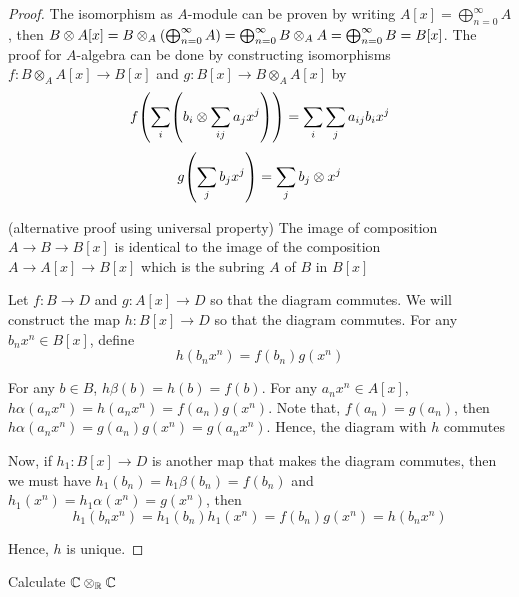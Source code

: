 \begin{proof}
	The isomorphism as $A$-module can be proven by writing $A[x] = \bigoplus_{n=0}^\infty A$, then $B \otimes A[x] = B \otimes_A \tuple*{\bigoplus_{n=0}^\infty A} = \bigoplus_{n=0}^\infty B \otimes_A A = \bigoplus_{n=0}^\infty B = B[x]$. The proof for $A$-algebra can be done by constructing isomorphisms $f: B \otimes_A A[x] \to B[x]$ and $g: B[x] \to B \otimes_A A[x]$ by
	$$
		f\tuple*{\sum_{i} \tuple*{b_i \otimes \sum_{ij} a_{j} x^j}} = \sum_{i} \sum_{j} a_{ij} b_i x^j
	$$
	$$
		g\tuple*{\sum_{j} b_j x^j} = \sum_{j} b_j \otimes x^j
	$$
	
	(alternative proof using universal property) 
	The image of composition $A \to B \to B[x]$ is identical to the image of the composition $A \to A[x] \to B[x]$ which is the subring $A$ of $B$ in $B[x]$
	\begin{center}
	\end{center}
	
	Let $f: B \to D$ and $g: A[x] \to D$ so that the diagram commutes. We will construct the map $h: B[x] \to D$ so that the diagram commutes. For any $b_n x^n \in B[x]$, define
	$$
		h(b_n x^n) = f(b_n) g(x^n)
	$$
	
	For any $b \in B$, $h \beta(b) = h(b) = f(b)$. For any $a_n x^n \in A[x]$, $h \alpha (a_n x^n) = h(a_n x^n) = f(a_n) g(x^n)$. Note that, $f(a_n) = g(a_n)$, then $h \alpha (a_n x^n) = g(a_n) g(x^n) = g(a_n x^n)$. Hence, the diagram with $h$ commutes
	
	Now, if $h_1: B[x] \to D$ is another map that makes the diagram commutes, then we must have $h_1(b_n) = h_1 \beta (b_n) = f(b_n)$ and $h_1(x^n) = h_1 \alpha(x^n) = g(x^n)$, then
	$$
		h_1(b_n x^n) = h_1(b_n) h_1(x^n) = f(b_n) g(x^n) = h(b_n x^n)
	$$
	
	Hence, $h$ is unique.
\end{proof}

\begin{remark}
	Calculate $\C \otimes_\R \C$
\end{remark}

